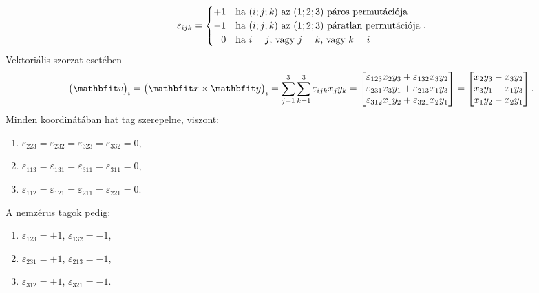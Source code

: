 \begin{note}
  $$
    \varepsilon_{ijk} =
    \begin{cases}
      +1         & \text{ha } (i;j;k) \text{ az } (1;2;3) \text{ páros permutációja}    \\
      -1         & \text{ha } (i;j;k) \text{ az } (1;2;3) \text{ páratlan permutációja} \\
      \phantom-0 & \text{ha } i = j \text{, vagy } j = k \text{, vagy } k = i
    \end{cases}
    \text.
  $$
  Vektoriális szorzat esetében
  $$
    \bigl(\rvec v\bigr)_i
    = \bigl(\rvec x \times \rvec y\bigr)_i
    = \sum_{j=1}^3 \sum_{k=1}^3 \varepsilon_{ijk} x_j y_k
    = \begin{bmatrix}
      \varepsilon_{123} x_2 y_3 + \varepsilon_{132} x_3 y_2 \\
      \varepsilon_{231} x_3 y_1 + \varepsilon_{213} x_1 y_3 \\
      \varepsilon_{312} x_1 y_2 + \varepsilon_{321} x_2 y_1
    \end{bmatrix} = \begin{bmatrix}
      x_2 y_3 - x_3 y_2 \\
      x_3 y_1 - x_1 y_3 \\
      x_1 y_2 - x_2 y_1
    \end{bmatrix}
    \text.
  $$
  Minden koordinátában hat tag szerepelne, viszont:
  \begin{enumerate}
    \item $\varepsilon_{223} = \varepsilon_{232} = \varepsilon_{323} = \varepsilon_{332} = 0$,
    \item $\varepsilon_{113} = \varepsilon_{131} = \varepsilon_{311} = \varepsilon_{311} = 0$,
    \item $\varepsilon_{112} = \varepsilon_{121} = \varepsilon_{211} = \varepsilon_{221} = 0$.
  \end{enumerate}
  A nemzérus tagok pedig:
  \begin{enumerate}
    \item $\varepsilon_{123} = +1$, $\varepsilon_{132} = -1$,
    \item $\varepsilon_{231} = +1$, $\varepsilon_{213} = -1$,
    \item $\varepsilon_{312} = +1$, $\varepsilon_{321} = -1$.
  \end{enumerate}
\end{note}


